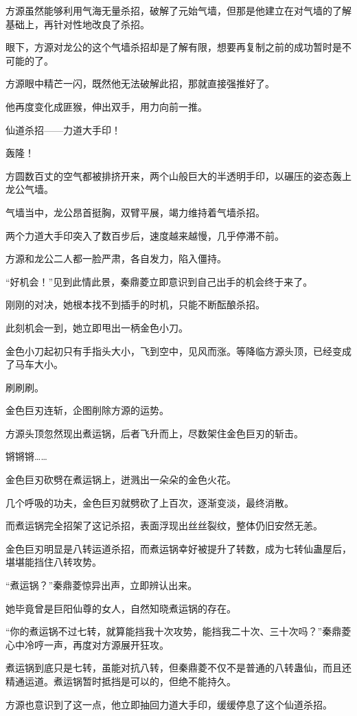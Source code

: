 \begin{this_body}
方源虽然能够利用气海无量杀招，破解了元始气墙，但那是他建立在对气墙的了解基础上，再针对性地改良了杀招。

眼下，方源对龙公的这个气墙杀招却是了解有限，想要再复制之前的成功暂时是不可能的了。

方源眼中精芒一闪，既然他无法破解此招，那就直接强推好了。

他再度变化成匪猴，伸出双手，用力向前一推。

仙道杀招——力道大手印！

轰隆！

方圆数百丈的空气都被排挤开来，两个山般巨大的半透明手印，以碾压的姿态轰上龙公气墙。

气墙当中，龙公昂首挺胸，双臂平展，竭力维持着气墙杀招。

两个力道大手印突入了数百步后，速度越来越慢，几乎停滞不前。

方源和龙公二人都一脸严肃，各自发力，陷入僵持。

“好机会！”见到此情此景，秦鼎菱立即意识到自己出手的机会终于来了。

刚刚的对决，她根本找不到插手的时机，只能不断酝酿杀招。

此刻机会一到，她立即甩出一柄金色小刀。

金色小刀起初只有手指头大小，飞到空中，见风而涨。等降临方源头顶，已经变成了马车大小。

刷刷刷。

金色巨刃连斩，企图削除方源的运势。

方源头顶忽然现出煮运锅，后者飞升而上，尽数架住金色巨刃的斩击。

锵锵锵……

金色巨刃砍劈在煮运锅上，迸溅出一朵朵的金色火花。

几个呼吸的功夫，金色巨刃就劈砍了上百次，逐渐变淡，最终消散。

而煮运锅完全招架了这记杀招，表面浮现出丝丝裂纹，整体仍旧安然无恙。

金色巨刃明显是八转运道杀招，而煮运锅幸好被提升了转数，成为七转仙蛊屋后，堪堪能挡住八转攻势。

“煮运锅？”秦鼎菱惊异出声，立即辨认出来。

她毕竟曾是巨阳仙尊的女人，自然知晓煮运锅的存在。

“你的煮运锅不过七转，就算能挡我十次攻势，能挡我二十次、三十次吗？”秦鼎菱心中冷哼一声，再度对方源展开狂攻。

煮运锅到底只是七转，虽能对抗八转，但秦鼎菱不仅不是普通的八转蛊仙，而且还精通运道。煮运锅暂时抵挡是可以的，但绝不能持久。

方源也意识到了这一点，他立即抽回力道大手印，缓缓停息了这个仙道杀招。


\end{this_body}
